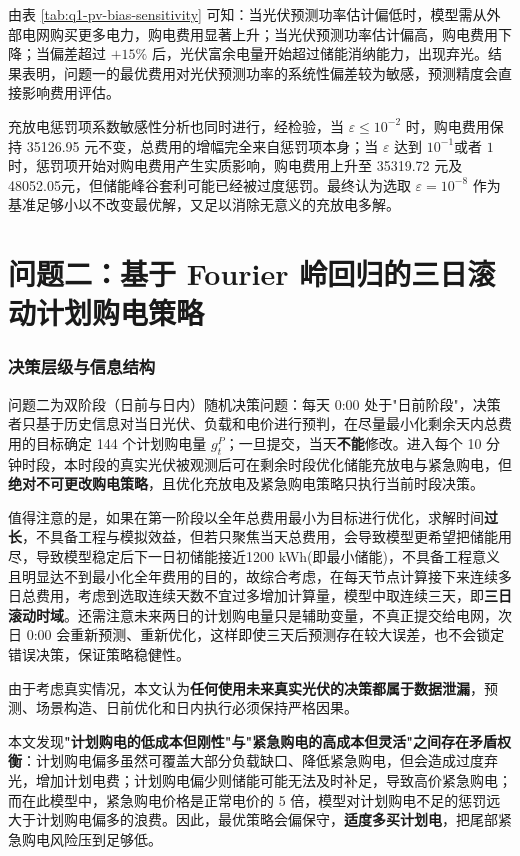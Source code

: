 \documentclass[withoutpreface,bwprint]{cumcmthesis} %
\begin{document}
由表 \ref{tab:q1-pv-bias-sensitivity} 可知：当光伏预测功率估计偏低时，模型需从外部电网购买更多电力，购电费用显著上升；当光伏预测功率估计偏高，购电费用下降；当偏差超过 $+15\%$ 后，光伏富余电量开始超过储能消纳能力，出现弃光。结果表明，问题一的最优费用对光伏预测功率的系统性偏差较为敏感，预测精度会直接影响费用评估。

充放电惩罚项系数敏感性分析也同时进行，经检验，当 $\varepsilon\leq10^{-2}$ 时，购电费用保持 35126.95 元不变，总费用的增幅完全来自惩罚项本身；当 $\varepsilon$ 达到 $10^{-1}$或者 $1$时，惩罚项开始对购电费用产生实质影响，购电费用上升至 35319.72 元及48052.05元，但储能峰谷套利可能已经被过度惩罚。最终认为选取 $\varepsilon=10^{-8}$ 作为基准足够小以不改变最优解，又足以消除无意义的充放电多解。
\section{问题二：基于 Fourier 岭回归的三日滚动计划购电策略}

\subsubsection{决策层级与信息结构}

问题二为双阶段（日前与日内）随机决策问题：每天 0:00 处于"日前阶段"，决策者只基于历史信息对当日光伏、负载和电价进行预判，在尽量最小化剩余天内总费用的目标确定 144 个计划购电量 $g^P_t$；一旦提交，当天\textbf{不能}修改。进入每个 10 分钟时段，本时段的真实光伏被观测后可在剩余时段优化储能充放电与紧急购电，但\textbf{绝对不可更改购电策略}，且优化充放电及紧急购电策略只执行当前时段决策。

值得注意的是，如果在第一阶段以全年总费用最小为目标进行优化，求解时间\textbf{过长}，不具备工程与模拟效益，但若只聚焦当天总费用，会导致模型更希望把储能用尽，导致模型稳定后下一日初储能接近1200 kWh(即最小储能)，不具备工程意义且明显达不到最小化全年费用的目的，故综合考虑，在每天节点计算接下来连续多日总费用，考虑到选取连续天数不宜过多增加计算量，模型中取连续三天，即\textbf{三日滚动时域}。还需注意未来两日的计划购电量只是辅助变量，不真正提交给电网，次日 0:00 会重新预测、重新优化，这样即使三天后预测存在较大误差，也不会锁定错误决策，保证策略稳健性。

由于考虑真实情况，本文认为\textbf{任何使用未来真实光伏的决策都属于数据泄漏}，预测、场景构造、日前优化和日内执行必须保持严格因果。

本文发现\textbf{"计划购电的低成本但刚性"与"紧急购电的高成本但灵活"之间存在矛盾权衡}：计划购电偏多虽然可覆盖大部分负载缺口、降低紧急购电，但会造成过度弃光，增加计划电费；计划购电偏少则储能可能无法及时补足，导致高价紧急购电；而在此模型中，紧急购电价格是正常电价的 5 倍，模型对计划购电不足的惩罚远大于计划购电偏多的浪费。因此，最优策略会偏保守，\textbf{适度多买计划电}，把尾部紧急购电风险压到足够低。
 
\end{document}

